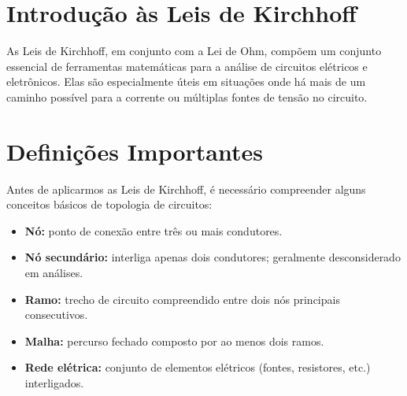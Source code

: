 \label{cap7}




\section{Introdução às Leis de Kirchhoff}
As Leis de Kirchhoff, em conjunto com a Lei de Ohm, compõem um conjunto essencial de ferramentas matemáticas para a análise de circuitos elétricos e eletrônicos. Elas são especialmente úteis em situações onde há mais de um caminho possível para a corrente ou múltiplas fontes de tensão no circuito.

\section{Definições Importantes}
Antes de aplicarmos as Leis de Kirchhoff, é necessário compreender alguns conceitos básicos de topologia de circuitos:

\begin{itemize}
    \item \textbf{Nó:} ponto de conexão entre três ou mais condutores.
    \item \textbf{Nó secundário:} interliga apenas dois condutores; geralmente desconsiderado em análises.
    \item \textbf{Ramo:} trecho de circuito compreendido entre dois nós principais consecutivos.
    \item \textbf{Malha:} percurso fechado composto por ao menos dois ramos.
    \item \textbf{Rede elétrica:} conjunto de elementos elétricos (fontes, resistores, etc.) interligados.
\end{itemize}

